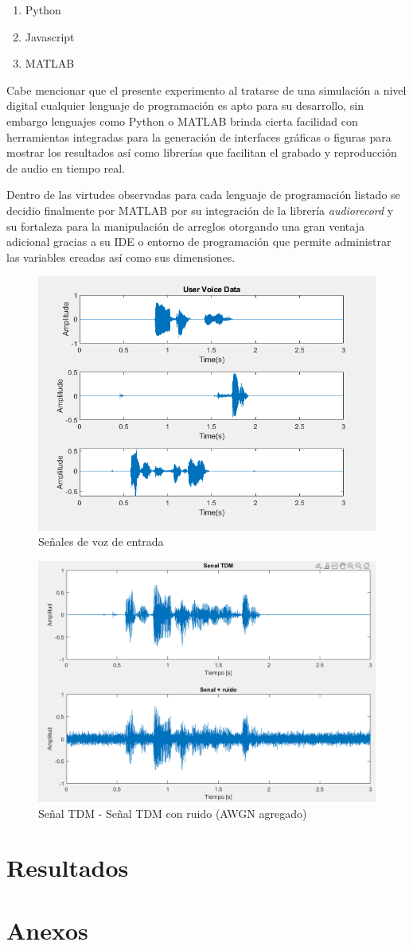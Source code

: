 \documentclass[conference]{IEEEtran}
\begin{document}
	\begin{enumerate}
		\item Python
		\item Javascript
		\item MATLAB
	\end{enumerate}
	
	Cabe mencionar que el presente experimento al tratarse de una simulación a nivel digital cualquier lenguaje de programación es apto para su desarrollo, sin embargo lenguajes como Python o MATLAB brinda cierta facilidad con herramientas integradas para la generación de interfaces gráficas o figuras para mostrar los resultados así como librerías que facilitan el grabado y reproducción de audio en tiempo real.
	
	Dentro de las virtudes observadas para cada lenguaje de programación listado se decidio finalmente por MATLAB por su integración de la librería \textit{audiorecord} y su fortaleza para la manipulación de arreglos otorgando una gran ventaja adicional gracias a su IDE o entorno de programación que permite administrar las variables creadas así como sus dimensiones.
	
	
	\begin{figure}[h]
		\centering
		\includegraphics[width=0.5\linewidth]{media/input-signals-voice}
		\caption{Señales de voz de entrada}
		\label{fig:input-signals-voice}
	\end{figure}
	
	\begin{figure}[h]
		\centering
		\includegraphics[width=0.5\linewidth]{media/tmd-signal-and-noise}
		\caption{Señal TDM - Señal TDM con ruido (AWGN agregado)}
		\label{fig:tmd-signal-and-noise}
	\end{figure}
	
	\section{Resultados}
	
	
	
	
	
	\section{Anexos}
\end{document}
